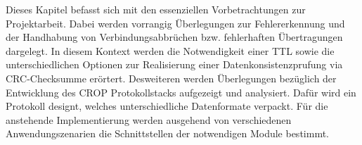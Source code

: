 \label{cap:konzept}

Dieses Kapitel befasst sich mit den essenziellen Vorbetrachtungen zur
Projektarbeit. Dabei werden vorrangig {\"U}berlegungen zur Fehlererkennung
und der Handhabung von Verbindungsabbr{\"u}chen bzw. fehlerhaften
{\"U}bertragungen dargelegt. In diesem Kontext werden die Notwendigkeit einer
TTL sowie die unterschiedlichen Optionen zur Realisierung einer Datenkonsistenzpr{u}fung
via CRC-Checksumme er{\"o}rtert. Desweiteren werden {\"U}berlegungen
bez{\"u}glich der Entwicklung des CROP Protokollstacks aufgezeigt und
analysiert. Dafür wird ein Protokoll designt, welches unterschiedliche
Datenformate  verpackt. Für die
anstehende Implementierung werden ausgehend von verschiedenen Anwendungszenarien
die Schnittstellen der notwendigen Module bestimmt.